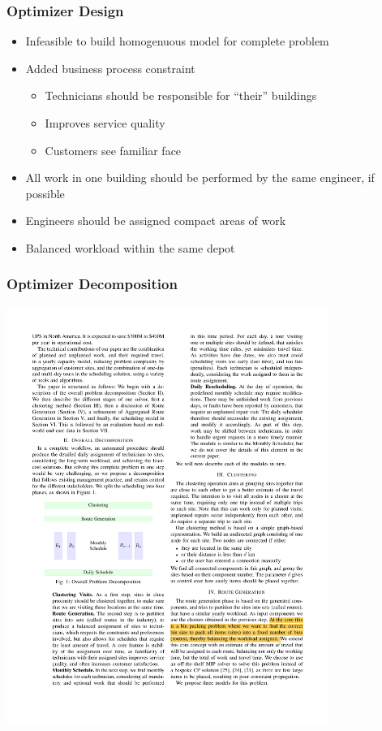 \begin{frame}
\frametitle{Optimizer Design}
\begin{itemize}
\item Infeasible to build homogenuous model for complete problem
\item Added business process constraint
\begin{itemize}
\item Technicians should be responsible for ``their'' buildings
\item Improves service quality
\item Customers see familiar face
\end{itemize}
\item All work in one building should be performed by the same engineer, if possible
\item Engineers should be assigned compact areas of work
\item Balanced workload within the same depot
\end{itemize}
\end{frame}

\begin{frame}
\frametitle{Optimizer Decomposition}
\includegraphics[width=10.5cm]{imagesfieldservice/decomposition}
\end{frame}


